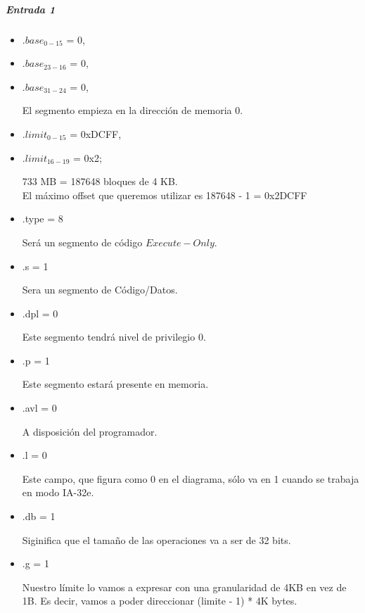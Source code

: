 \subparagraph*{Entrada 1}
\begin{itemize}
	
    \item $.base_{0-15}$ = 0,

    \item $.base_{23-16}$ = 0,
    \item $.base_{31-24}$ = 0,
    
El segmento empieza en la dirección de memoria 0.
        
    \item $.limit_{0-15}$ = 0xDCFF,
    \item $.limit_{16-19}$ = 0x2;

733 MB = 187648 bloques de 4 KB.
\\ El máximo offset que queremos utilizar es 187648 - 1 = 0x2DCFF 
    
    \item .type = 8
        
Será un segmento de código $Execute-Only$.
        
    \item .s  = 1
        
Sera un segmento de Código/Datos.
        
    \item .dpl = 0
        
Este segmento tendrá nivel de privilegio 0.

    \item .p = 1
        
Este segmento estará presente en memoria.
    
    \item .avl = 0
        
A disposición del programador.


    \item .l = 0
        
Este campo, que figura como 0 en el diagrama, sólo va en 1 cuando se trabaja en modo IA-32e.

    \item .db = 1
        
Siginifica que el tamaño de las operaciones va a ser de 32 bits.

    \item .g = 1

Nuestro límite lo vamos a expresar con una granularidad de 4KB en vez de 1B. Es decir, vamos a poder direccionar (limite - 1) * 4K bytes.

\end{itemize}


